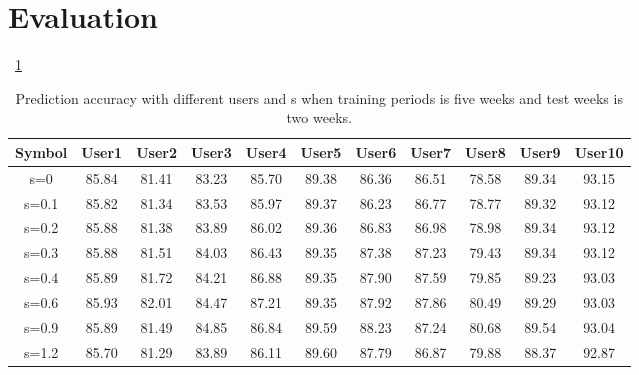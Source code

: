 \section{Evaluation}
\label{sec:design}

~\ref{tbl: accuracy_s_user}

\begin{table}[t]
\setlength{\tabcolsep}{1.2em}
\scriptsize
  \centering
  \caption{Prediction accuracy with different users and s when training periods is five weeks and test weeks is two weeks.}
  \begin{tabular}{|c|c|c|c|c|c|c|c|c|c|c|}
     \hline
     Symbol & User1 & User2 & User3 & User4 & User5 & User6 & User7 & User8 & User9 & User10  \\
     \hline
     \hline
     s=0 & 85.84 & 81.41 & 83.23 & 85.70 & 89.38  & 86.36 & 86.51 & 78.58 & 89.34 & 93.15  \\
     \hline
     s=0.1 & 85.82 & 81.34 & 83.53 & 85.97 & 89.37  & 86.23 & 86.77 & 78.77 & 89.32 & 93.12  \\
     \hline
     s=0.2 & 85.88 & 81.38 & 83.89 & 86.02 & 89.36  & 86.83 & 86.98 & 78.98 & 89.34 & 93.12  \\
     \hline
     s=0.3 & 85.88 & 81.51 & 84.03 & 86.43 & 89.35  & 87.38 & 87.23 & 79.43 & 89.34 & 93.12  \\
     \hline
     s=0.4 & 85.89 & 81.72 & 84.21 & 86.88 & 89.35  & 87.90 & 87.59 & 79.85 & 89.23 & 93.03  \\
     \hline
     s=0.6 & 85.93 & 82.01 & 84.47 & 87.21 & 89.35  & 87.92 & 87.86 & 80.49 & 89.29 & 93.03  \\
     \hline
     s=0.9 & 85.89 & 81.49 & 84.85 & 86.84 & 89.59  & 88.23 & 87.24 & 80.68 & 89.54 & 93.04  \\
     \hline
     s=1.2 & 85.70 & 81.29 & 83.89 & 86.11 & 89.60  & 87.79 & 86.87 & 79.88 & 88.37 & 92.87  \\
     \hline
   \end{tabular}
 \label{tbl: accuracy_s_user}
 \vspace{-0.1in}
\end{table}
